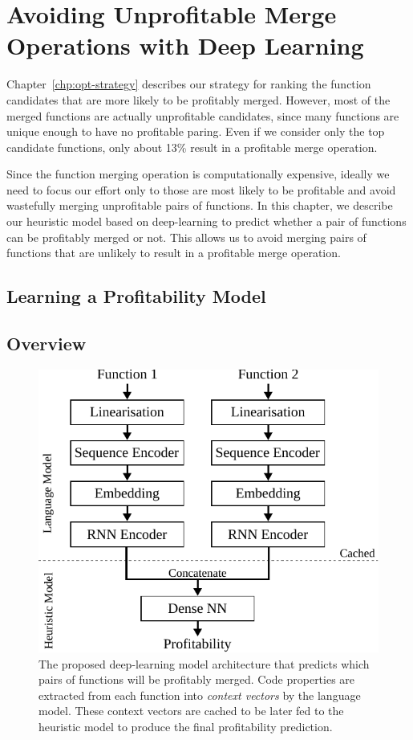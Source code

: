 
\chapter{Avoiding Unprofitable Merge Operations with Deep Learning} \label{chp:deeplearning}

Chapter~\ref{chp:opt-strategy} describes our strategy for ranking the function candidates that are more likely to be profitably merged.
However, most of the merged functions are actually unprofitable candidates, since many functions are unique enough to have no profitable paring.
Even if we consider only the top candidate functions, only about 13\% result in a profitable merge operation.

Since the function merging operation is computationally expensive, ideally we need to focus our effort only to those are most likely to be profitable and avoid wastefully merging unprofitable pairs of functions.
In this chapter, we describe our heuristic model based on deep-learning to predict whether a pair of functions can be
profitably merged or not.
This allows us to avoid merging pairs of functions that are unlikely to result in a profitable merge operation.

\section{Learning a Profitability Model}

\section{Overview}

\begin{figure}[h]
  \centering
  \includegraphics[scale=0.85]{src/deeplearning/figs/deeplearning-architecture.pdf}
  \caption{
      The proposed deep-learning model architecture that predicts which pairs of functions will be profitably merged. Code properties are extracted from each function into \textit{context vectors} by the language model.
      These context vectors are cached to be later fed to the heuristic model to produce the final profitability prediction.}
  \label{fig:heuristic-model-architecture}
\end{figure}

